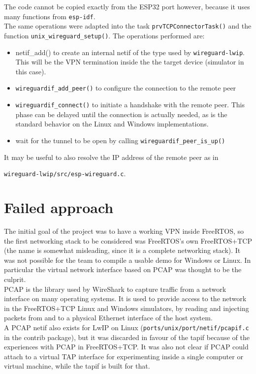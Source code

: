 \begin{enumerate}
    The code cannot be copied exactly from the ESP32 port however, because it uses many functions from \texttt{esp-idf}.\\
    The same operations were adapted into the task \texttt{prvTCPConnectorTask()} and the function \texttt{unix\_wireguard\_setup()}.
    The operations performed are:
    \begin{itemize}
        \item netif\_add() to create an internal netif of the type used by \texttt{wireguard-lwip}. This will be the VPN termination inside the the target device (simulator in this case).
        \item \texttt{wireguardif\_add\_peer()} to configure the connection to the remote peer
        \item \texttt{wireguardif\_connect()} to initiate a handshake with the remote peer. This phase can be delayed until the connection is actually needed, as is the standard behavior on the Linux and Windows implementations.
        \item wait for the tunnel to be open by calling \texttt{wireguardif\_peer\_is\_up()}
    \end{itemize}
    It may be useful to also resolve the IP address of the remote peer as in 
    
    \texttt{wireguard-lwip/src/esp-wireguard.c}. 
    
\end{enumerate}

\section{Failed approach}
The initial goal of the project was to have a working VPN inside FreeRTOS, so the first networking stack to be considered was FreeRTOS's own FreeRTOS+TCP (the name is somewhat misleading, since it is a complete networking stack). It was not possible for the team to compile a usable demo for Windows or Linux. In particular the virtual network interface based on PCAP was thought to be the culprit.\\
PCAP is the library used by WireShark \cite{WireShark} to capture traffic from a network interface on many operating systems. It is used to provide access to the network in the FreeRTOS+TCP Linux and Windows simulators, by reading and injecting packets from and to a physical Ethernet interface of the host system.\\
A PCAP netif also exists for LwIP on Linux (\texttt{ports/unix/port/netif/pcapif.c} in the contrib package), but it was discarded in favour of the tapif because of the experiences with PCAP in FreeRTOS+TCP.
It was also not clear if PCAP could attach to a virtual TAP interface for experimenting inside a single computer or virtual machine, while the tapif is built for that.


